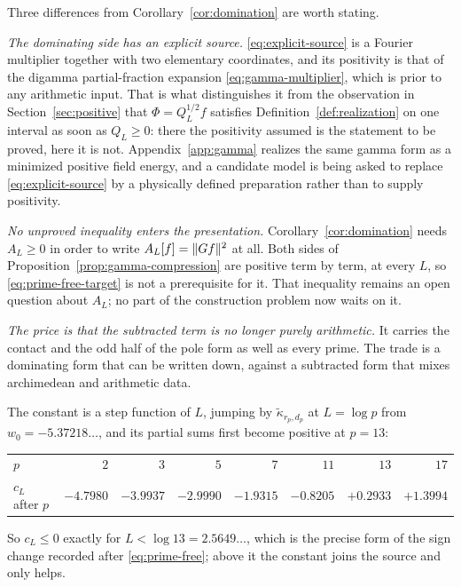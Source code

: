 Three differences from Corollary~\ref{cor:domination} are worth stating.

\emph{The dominating side has an explicit source.} \eqref{eq:explicit-source}
is a Fourier multiplier together with two elementary coordinates, and its
positivity is that of the digamma partial-fraction expansion
\eqref{eq:gamma-multiplier}, which is prior to any arithmetic input. That is
what distinguishes it from the observation in Section~\ref{sec:positive} that
$\Phi=Q_L^{1/2}f$ satisfies Definition~\ref{def:realization} on one interval as
soon as $Q_L\geq0$: there the positivity assumed is the statement to be proved,
here it is not. Appendix~\ref{app:gamma} realizes the same gamma form as a
minimized positive field energy, and a candidate model is being asked to
replace \eqref{eq:explicit-source} by a physically defined preparation rather
than to supply positivity.

\emph{No unproved inequality enters the presentation.}
Corollary~\ref{cor:domination} needs $A_L\geq0$ in order to write
$A_L[f]=\lVert Gf\rVert^2$ at all. Both sides of
Proposition~\ref{prop:gamma-compression} are positive term by term, at every
$L$, so \eqref{eq:prime-free-target} is not a prerequisite for it.
That inequality remains an open question about $A_L$; no part of the
construction problem now waits on it.

\emph{The price is that the subtracted term is no longer purely arithmetic.}
It carries the contact and the odd half of the pole form as well as every
prime. The trade is a dominating form that can be written down, against a
subtracted form that mixes archimedean and arithmetic data.

The constant is a step function of $L$, jumping by
$\widetilde\kappa_{r_p,d_p}$ at $L=\log p$ from $w_0=-5.37218\ldots$, and its
partial sums first become positive at $p=13$:
\begin{center}
\small
\begin{tabular}{lrrrrrrr}
\toprule
$p$ & $2$ & $3$ & $5$ & $7$ & $11$ & $13$ & $17$\\
$c_L$ after $p$ & $-4.7980$ & $-3.9937$ & $-2.9990$ & $-1.9315$ & $-0.8205$
 & $+0.2933$ & $+1.3994$\\
\bottomrule
\end{tabular}
\end{center}
So $c_L\leq0$ exactly for $L<\log13=2.5649\ldots$, which is the precise form of
the sign change recorded after \eqref{eq:prime-free}; above it the constant
joins the source and only helps.

